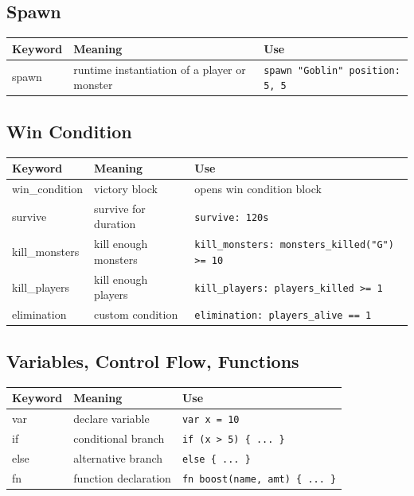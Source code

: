 \documentclass[12pt,a4paper]{article}
\begin{document}
\subsection{Spawn}
\begin{longtable}{KMU}
\toprule
\normalfont\textbf{Keyword} & \textbf{Meaning} & \textbf{Use} \\
\midrule
spawn & runtime instantiation of a player or monster & \texttt{spawn "Goblin" position: 5, 5} \\
\bottomrule
\end{longtable}

\subsection{Win Condition}
\begin{longtable}{KMU}
\toprule
\normalfont\textbf{Keyword} & \textbf{Meaning} & \textbf{Use} \\
\midrule
win\_condition  & victory block        & opens win condition block \\
survive         & survive for duration & \texttt{survive: 120s} \\
kill\_monsters  & kill enough monsters & \texttt{kill\_monsters: monsters\_killed("G") >= 10} \\
kill\_players   & kill enough players  & \texttt{kill\_players: players\_killed >= 1} \\
elimination     & custom condition     & \texttt{elimination: players\_alive == 1} \\
\bottomrule
\end{longtable}

\subsection{Variables, Control Flow, Functions}
\begin{longtable}{KMU}
\toprule
\normalfont\textbf{Keyword} & \textbf{Meaning} & \textbf{Use} \\
\midrule
var  & declare variable    & \texttt{var x = 10} \\
if   & conditional branch  & \texttt{if (x > 5) \{ ... \}} \\
else & alternative branch  & \texttt{else \{ ... \}} \\
fn   & function declaration & \texttt{fn boost(name, amt) \{ ... \}} \\
\bottomrule
\end{longtable}
\end{document}
